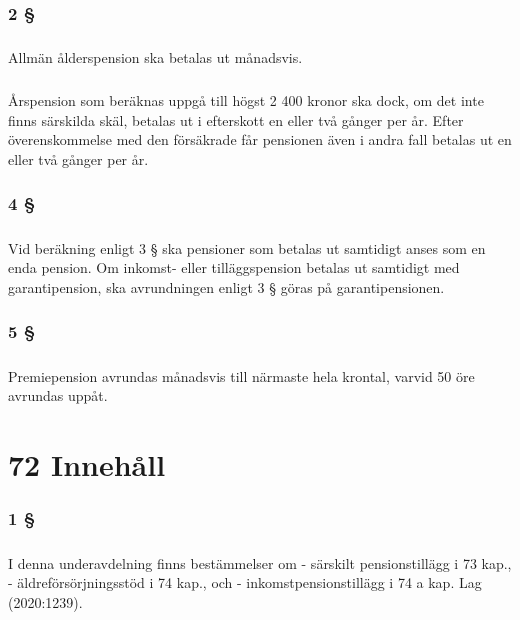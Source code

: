 \documentclass[a4paper,notitlepage,openany,10pt]{book}
\begin{document}
\subsection*{2 §}
\paragraph*{}
Allmän ålderspension ska betalas ut månadsvis.
\paragraph*{}
Årspension som beräknas uppgå till högst 2 400 kronor ska dock, om det inte finns särskilda skäl, betalas ut i efterskott en eller två gånger per år. Efter överenskommelse med den försäkrade får pensionen även i andra fall betalas ut en eller två gånger per år.
\subsection*{4 §}
\paragraph*{}
Vid beräkning enligt 3 § ska pensioner som betalas ut samtidigt anses som en enda pension.
Om inkomst- eller tilläggspension betalas ut samtidigt med garantipension, ska avrundningen enligt 3 § göras på garantipensionen.
\subsection*{5 §}
\paragraph*{}
Premiepension avrundas månadsvis till närmaste hela krontal, varvid 50 öre avrundas uppåt.
\chapter*{72 Innehåll}
\subsection*{1 §}
\paragraph*{}
I denna underavdelning finns bestämmelser om
\newline - särskilt pensionstillägg i 73 kap.,
\newline - äldreförsörjningsstöd i 74 kap., och
\newline - inkomstpensionstillägg i 74 a kap.
Lag (2020:1239).
\end{document}
